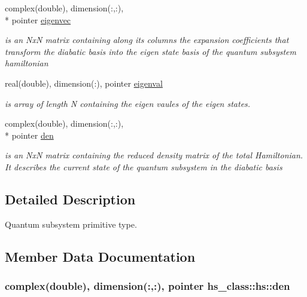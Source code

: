 \begin{DoxyCompactItemize}
complex(double), dimension(\+:,\+:), \\*
pointer \hyperlink{strucths__class_1_1hs_aac60f7bc14df6c4a5a1363c70b69b2db}{eigenvec}
\begin{DoxyCompactList}\small\item\em is an Nx\+N matrix containing along its columns the expansion coefficients that transform the diabatic basis into the eigen state basis of the quantum subsystem hamiltonian \end{DoxyCompactList}\item 
real(double), dimension(\+:), pointer \hyperlink{strucths__class_1_1hs_ae978013c998c123a7430209fa2797511}{eigenval}
\begin{DoxyCompactList}\small\item\em is array of length N containing the eigen vaules of the eigen states. \end{DoxyCompactList}\item 
complex(double), dimension(\+:,\+:), \\*
pointer \hyperlink{strucths__class_1_1hs_ad8d40ef9d0cb7af5e9d889f2ec05225d}{den}
\begin{DoxyCompactList}\small\item\em is an Nx\+N matrix containing the reduced density matrix of the total Hamiltonian. It describes the current state of the quantum subsystem in the diabatic basis \end{DoxyCompactList}\end{DoxyCompactItemize}


\subsection{Detailed Description}
Quantum subsystem primitive type. 

\subsection{Member Data Documentation}
\hypertarget{strucths__class_1_1hs_ad8d40ef9d0cb7af5e9d889f2ec05225d}{
\subsubsection[{den}]{\setlength{\rightskip}{0pt plus 5cm}complex(double), dimension(\+:,\+:), pointer hs\+\_\+class\+::hs\+::den\hspace{0.3cm}{\ttfamily [private]}}}\label{strucths__class_1_1hs_ad8d40ef9d0cb7af5e9d889f2ec05225d}


